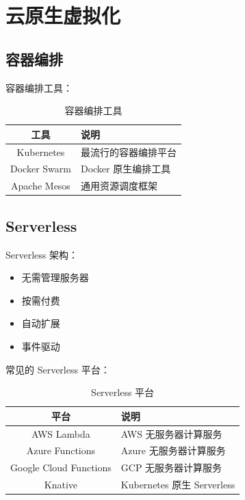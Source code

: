 \documentclass[12pt,UTF8]{ctexbook}
\begin{document}
\chapter{云原生虚拟化}
\label{chap:cloud_native}

\section{容器编排}
\label{sec:container_orchestration}

容器编排工具：
\begin{table}[htbp]
    \centering
    \caption{容器编排工具}
    \begin{tabular}{|c|p{8cm}|}
        \hline
        \textbf{工具} & \textbf{说明} \\
        \hline
        Kubernetes & 最流行的容器编排平台 \\
        \hline
        Docker Swarm & Docker 原生编排工具 \\
        \hline
        Apache Mesos & 通用资源调度框架 \\
        \hline
    \end{tabular}
\end{table}

\section{Serverless}
\label{sec:serverless}

Serverless 架构：
\begin{itemize}
    \item 无需管理服务器
    \item 按需付费
    \item 自动扩展
    \item 事件驱动
\end{itemize}

常见的 Serverless 平台：
\begin{table}[htbp]
    \centering
    \caption{Serverless 平台}
    \begin{tabular}{|c|p{8cm}|}
        \hline
        \textbf{平台} & \textbf{说明} \\
        \hline
        AWS Lambda & AWS 无服务器计算服务 \\
        \hline
        Azure Functions & Azure 无服务器计算服务 \\
        \hline
        Google Cloud Functions & GCP 无服务器计算服务 \\
        \hline
        Knative & Kubernetes 原生 Serverless \\
        \hline
    \end{tabular}
\end{table}
\end{document}
